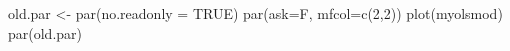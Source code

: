 \begin{Schunk}
\begin{Sinput}
 old.par <- par(no.readonly = TRUE)
 par(ask=F, mfcol=c(2,2))
 plot(myolsmod)
 par(old.par)
\end{Sinput}
\end{Schunk}
